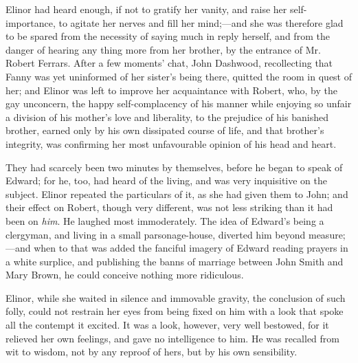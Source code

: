 Elinor had heard enough, if not to gratify her vanity, and raise her self-importance, to agitate her nerves and fill her mind;---and she was therefore glad to be spared from the necessity of saying much in reply herself, and from the danger of hearing any thing more from her brother, by the entrance of Mr. Robert Ferrars. After a few moments' chat, John Dashwood, recollecting that Fanny was yet uninformed of her sister's being there, quitted the room in quest of her; and Elinor was left to improve her acquaintance with Robert, who, by the gay unconcern, the happy self-complacency of his manner while enjoying so unfair a division of his mother's love and liberality, to the prejudice of his banished brother, earned only by his own dissipated course of life, and that brother's integrity, was confirming her most unfavourable opinion of his head and heart.

They had scarcely been two minutes by themselves, before he began to speak of Edward; for he, too, had heard of the living, and was very inquisitive on the subject. Elinor repeated the particulars of it, as she had given them to John; and their effect on Robert, though very different, was not less striking than it had been on {\em him}. He laughed most immoderately. The idea of Edward's being a clergyman, and living in a small parsonage-house, diverted him beyond measure;---and when to that was added the fanciful imagery of Edward reading prayers in a white surplice, and publishing the banns of marriage between John Smith and Mary Brown, he could conceive nothing more ridiculous.

Elinor, while she waited in silence and immovable gravity, the conclusion of such folly, could not restrain her eyes from being fixed on him with a look that spoke all the contempt it excited. It was a look, however, very well bestowed, for it relieved her own feelings, and gave no intelligence to him. He was recalled from wit to wisdom, not by any reproof of hers, but by his own sensibility.

